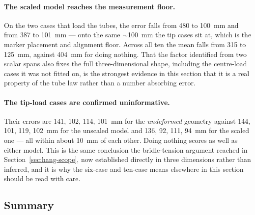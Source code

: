 \documentclass[11pt,a4paper]{article}
\begin{document}
\begin{table}[htbp]
\centering
\caption{Point-to-surface RMS between the solved shape and the photogrammetry
markers. ``As built'' is the undeformed geometry, included as the null model:
anything not beating it has explained nothing.}

\end{table}

\paragraph{The scaled model reaches the measurement floor.} On the two cases
that load the tubes, the error falls from \SI{480}{} to \SI{100}{mm} and from
\SI{387}{} to \SI{101}{mm} --- onto the same $\sim$\SI{100}{mm} the tip cases
sit at, which is the marker placement and alignment floor. Across all ten the
mean falls from \SI{315}{} to \SI{125}{mm}, against \SI{404}{mm} for doing
nothing. That the factor identified from two scalar spans also fixes the full
three-dimensional shape, including the centre-load cases it was not fitted on,
is the strongest evidence in this section that it is a real property of the tube
law rather than a number absorbing error.

\paragraph{The tip-load cases are confirmed uninformative.} Their errors are
\SI{141}{}, \SI{102}{}, \SI{114}{}, \SI{101}{mm} for the \emph{undeformed}
geometry against \SI{144}{}, \SI{101}{}, \SI{119}{}, \SI{102}{mm} for the
unscaled model and \SI{136}{}, \SI{92}{}, \SI{111}{}, \SI{94}{mm} for the scaled
one --- all within about \SI{10}{mm} of each other. Doing nothing scores as well
as either model. This is the same conclusion the bridle-tension argument reached
in Section~\ref{sec:hang-scope}, now established directly in three dimensions rather than inferred,
and it is why the six-case and ten-case means elsewhere in this section should be
read with care.

\subsection{Summary}
\end{document}
